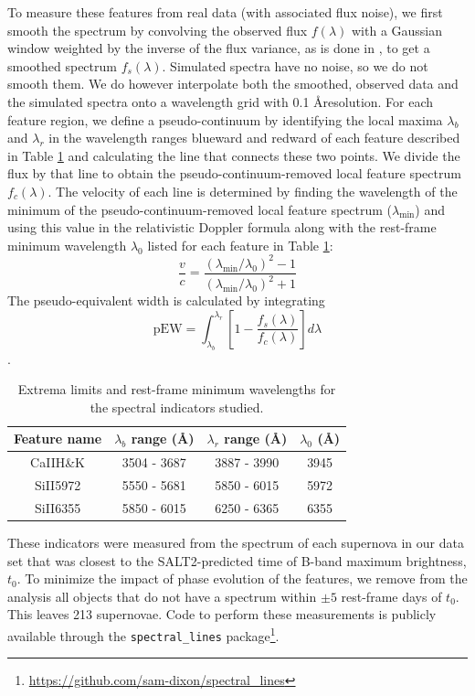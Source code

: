 To measure these features from real data (with associated flux noise), we first smooth the spectrum by convolving the observed flux $f(\lambda)$ with a Gaussian window weighted by the inverse of the flux variance, as is done in \cite{Blondin2006}, to get a smoothed spectrum $f_s(\lambda)$. Simulated spectra have no noise, so we do not smooth them. We do however interpolate both the smoothed, observed data and the simulated spectra onto a wavelength grid with 0.1 \AA resolution. For each feature region, we define a pseudo-continuum by identifying the local maxima $\lambda_{b}$ and $\lambda_{r}$ in the wavelength ranges blueward and redward of each feature described in Table \ref{tab:spec_feat_info} and calculating the line that connects these two points. We divide the flux by that line to obtain the pseudo-continuum-removed local feature spectrum $f_c(\lambda)$. The velocity of each line is determined by finding the wavelength of the minimum of the pseudo-continuum-removed local feature spectrum ($\lambda_\text{min}$) and using this value in the relativistic Doppler formula along with the rest-frame minimum wavelength $\lambda_0$ listed for each feature in Table \ref{tab:spec_feat_info}:
\begin{equation}
    \frac{v}{c} = \frac{\left(\lambda_\text{min}/\lambda_0\right)^2-1}{\left(\lambda_\text{min}/\lambda_0\right)^2+1}
    \label{eqn:rel_doppler}
\end{equation}
The pseudo-equivalent width is calculated by integrating
\begin{equation}
    \text{pEW} = \displaystyle\int_{\lambda_b}^{\lambda_r} \left[1-\frac{f_s(\lambda)}{f_c(\lambda)}\right] d\lambda
    \label{eqn:pew}
\end{equation}.

\begin{table}[ht!]
    \centering
    \begin{tabular}{|c|c|c|c|}\hline
    Feature name & $\lambda_b$ range (\AA) & $\lambda_r$ range (\AA) & $\lambda_0$ (\AA)\\\hline
    CaIIH\&K & 3504 - 3687 & 3887 - 3990 & 3945\\
    SiII5972 & 5550 - 5681 & 5850 - 6015 & 5972\\
    SiII6355 & 5850 - 6015 & 6250 - 6365 & 6355\\\hline
    \end{tabular}
    \caption{Extrema limits and rest-frame minimum wavelengths for the spectral indicators studied.}
    \label{tab:spec_feat_info}
\end{table}
These indicators were measured from the spectrum of each supernova in our data set that was closest to the SALT2-predicted time of B-band maximum brightness, $t_0$. To minimize the impact of phase evolution of the features, we remove from the analysis all objects that do not have a spectrum within $\pm 5$ rest-frame days of $t_0$. This leaves 213 supernovae. Code to perform these measurements is publicly available through the \verb|spectral_lines| package\footnote{\url{https://github.com/sam-dixon/spectral_lines}}.

